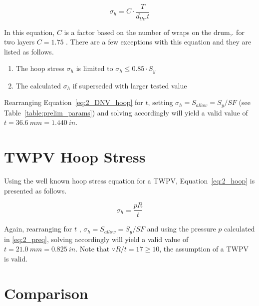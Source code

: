 \begin{equation}
	\label{eq:2_DNV_hoop}
	\sigma_h = C\cdot\frac{T}{d_{thr}t}
\end{equation}

In this equation, $C$ is a factor based on the number of wraps on the drum,. for two layers $C=1.75$ \cite{DNVOSD101}. There are a few exceptions with this equation and they are listed as follows.

\begin{enumerate}
	\item The hoop stress $\sigma_h$ is limited to $\sigma_h \leq 0.85\cdot S_y$
	\item The calculated $\sigma_h$  if superseded with larger tested value\\
\end{enumerate}

Rearranging Equation~\ref{eq:2_DNV_hoop} for $t$, setting $\sigma_h = S_{allow}=S_y/SF$ (see Table~\ref{table:prelim_params}) and solving accordingly will yield a valid value of $t = 36.6\ mm = 1.440 \ in$. 

\section{TWPV Hoop Stress}

Using the well known hoop stress equation \cite{roarks} for a TWPV, Equation~\ref{eq:2_hoop} is presented as follows.

\begin{equation}
	\label{eq:2_hoop}
	\sigma_h = \frac{pR}{t}
\end{equation}

Again, rearranging for $t$ , $\sigma_h = S_{allow}=S_y/SF$ and using the pressure $p$ calculated in \ref{eq:2_preq}, solving accordingly will yield a valid value of $t = 21.0\ mm = 0.825 \ in$. Note that $\because R/t = 17 \geq 10$, the assumption of a TWPV is valid.

\section{Comparison}

